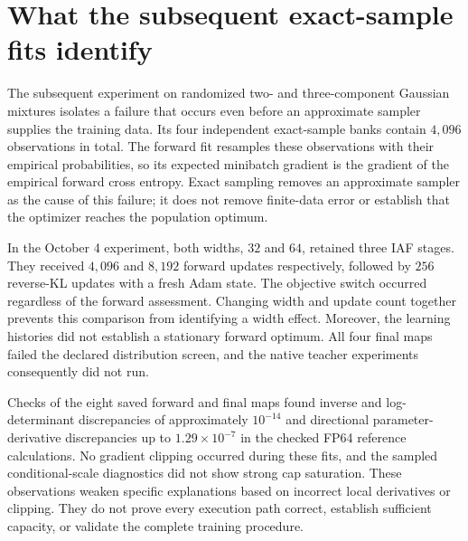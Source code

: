 \section[What the subsequent fits identify]{What the subsequent exact-sample fits identify}
\label{sec:neutra-october-fit-attribution}

The subsequent experiment on randomized two- and three-component Gaussian
mixtures isolates a failure that occurs even before an approximate sampler
supplies the training data. Its four independent exact-sample banks contain
$4{,}096$ observations in total. The forward fit resamples these observations
with their empirical probabilities, so its expected minibatch gradient is
the gradient of the empirical forward cross entropy. Exact sampling removes
an approximate sampler as the cause of this failure; it does not remove
finite-data error or establish that the optimizer reaches the population
optimum.

In the October 4 experiment, both widths, $32$ and $64$, retained three IAF
stages. They received $4{,}096$ and $8{,}192$ forward updates respectively,
followed by $256$ reverse-KL updates with a fresh Adam state. The objective
switch occurred regardless of the forward assessment. Changing width and
update count together prevents this comparison from identifying a width
effect. Moreover, the learning histories did not establish a stationary
forward optimum. All four final maps failed the declared distribution screen,
and the native teacher experiments consequently did not run.

Checks of the eight saved forward and final maps found inverse and
log-determinant discrepancies of approximately $10^{-14}$ and directional
parameter-derivative discrepancies up to $1.29\times10^{-7}$ in the
checked FP64 reference calculations. No gradient clipping occurred during
these fits, and the sampled conditional-scale diagnostics did not show strong
cap saturation. These observations weaken specific explanations based on
incorrect local derivatives or clipping. They do not prove every execution
path correct, establish sufficient capacity, or validate the complete
training procedure.

